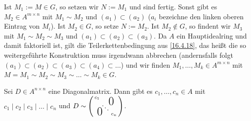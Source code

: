\documentclass[../../main.tex]{subfiles}
\begin{document}
\begin{cproof}
\noindent Ist $M_1:=M\in G$, so setzen wir $N:=M_1$ und sind fertig. Sonst gibt es $M_2\in A^{m\times n}$ mit $M_1\sim M_2$ und $(a_1)\subset(a_2)$ ($a_i$ bezeichne den linken oberen Eintrag von $M_i$). Ist $M_2\in G$, so setze $N:=M_2$. Ist $M_2\notin G$, so findent wir $M_3$ mit $M_1\sim M_2\sim M_3$ und $(a_1)\subset(a_2)\subset (a_3)$. Da $A$ ein Hauptidealring und damit faktoriell ist, gilt die Teilerkettenbedingung aus \ref{16.4.18}, das heißt die so weitergeführte Konstruktion muss irgendwann abbrechen (andernsfalls folgt $(a_1)\subset(a_2)\subset(a_3)\subset(a_4)\subset\ldots $) und wir finden $M_1,\ldots ,M_k\in A^{m\times n}$ mit $M=M_1\sim M_2\sim M_3\sim\ldots \sim M_k\in G$.
\end{cproof}

\begin{lem}\label{17.1.10}
Sei $D\in A^{n\times n}$ eine Diagonalmatrix. Dann gibt es $c_1,\ldots ,c_n\in A$ mit $c_1\mid c_2\mid c_3\mid \ldots \mid c_n$ und $D\sim \left(\begin{smallmatrix}
c_1 & & \llap{$\overset{\blap{\LARGE 0}}{~}$} \\
& \ddots &\\
\rlap{\tlap{\LARGE 0}} & & c_n
\end{smallmatrix}\right)$.
\end{lem}
\end{document}
